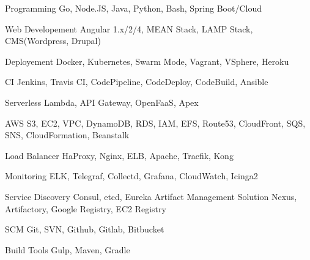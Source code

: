 

\begin{cvskills}


\cvskill
{Programming} %
{Go, Node.JS, Java, Python, Bash, Spring Boot/Cloud} %


\cvskill
{Web Developement} %
{Angular 1.x/2/4, MEAN Stack, LAMP Stack, CMS(Wordpress, Drupal)} %

\cvskill
{Deployement} %
{Docker, Kubernetes, Swarm Mode, Vagrant, VSphere, Heroku} %

\cvskill
{CI} %
{Jenkins, Travis CI, CodePipeline, CodeDeploy, CodeBuild, Ansible} %

\cvskill
{Serverless} %
{Lambda, API Gateway, OpenFaaS, Apex} %


\cvskill
{AWS} %
{S3, EC2, VPC, DynamoDB, RDS, IAM, EFS, Route53, CloudFront, SQS, SNS, CloudFormation, Beanstalk} %

\cvskill
{Load Balancer} %
{HaProxy, Nginx, ELB, Apache, Traefik, Kong} %

\cvskill
{Monitoring} %
{ELK, Telegraf, Collectd, Grafana, CloudWatch, Icinga2} %

\cvskill
{Service Discovery} %
{Consul, etcd, Eureka} %
\cvskill
{Artifact Management Solution} %
{Nexus, Artifactory, Google Registry, EC2 Registry} %

\cvskill
{SCM} %
{Git, SVN, Github, Gitlab, Bitbucket} %

\cvskill
{Build Tools} %
{Gulp, Maven, Gradle} %



\end{cvskills}
